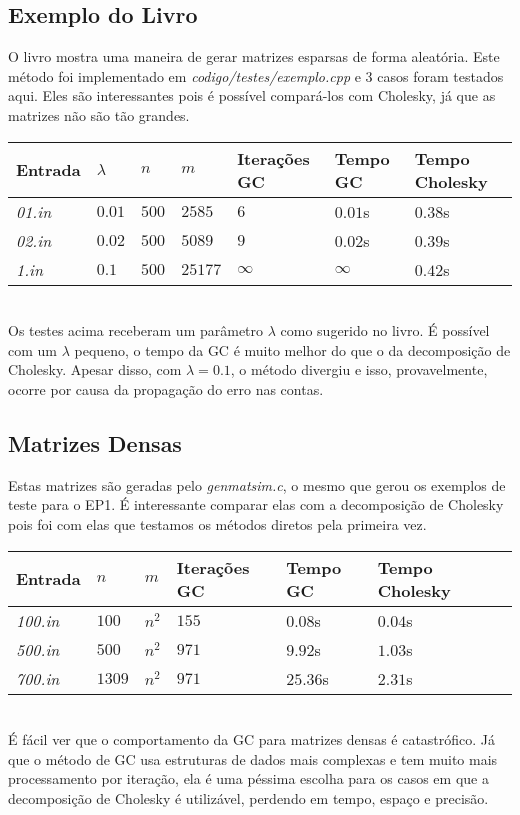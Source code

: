 \documentclass[
10pt, %
a4paper, %
oneside, %
headinclude,footinclude, %
BCOR5mm, %
]{scrartcl}
\begin{document}
\subsection{Exemplo do Livro}
O livro \cite{trefethen1997numerical} mostra uma maneira de gerar matrizes esparsas de forma aleatória. Este método foi implementado em \textit{codigo/testes/exemplo.cpp} e 3 casos foram testados aqui. Eles são interessantes pois é possível compará-los com Cholesky, já que as matrizes não são tão grandes. \\
\begin{tabular}{| l | l | l | l | l | l | l |}
    \hline
    Entrada & $\lambda$ & $n$ & $m$ & Iterações GC & Tempo GC & Tempo Cholesky \\ \hline
    \textit{01.in} & $0.01$ & $500$ & $2585$ & $6$ & $0.01$s & $0.38$s \\ \hline
    \textit{02.in} & $0.02$ & $500$ & $5089$ & $9$ & $0.02$s & $0.39$s \\ \hline
    \textit{1.in} & $0.1$ & $500$ & $25177$ & $\infty$ & $\infty$ & $0.42$s \\ \hline
\end{tabular} \\
Os testes acima receberam um parâmetro $\lambda$ como sugerido no livro. É possível com um $\lambda$ pequeno, o tempo da GC é muito melhor do que o da decomposição de Cholesky. Apesar disso, com $\lambda = 0.1$, o método divergiu e isso, provavelmente, ocorre por causa da propagação do erro nas contas.

\subsection{Matrizes Densas}
Estas matrizes são geradas pelo \textit{genmatsim.c}, o mesmo que gerou os exemplos de teste para o EP1. É interessante comparar elas com a decomposição de Cholesky pois foi com elas que testamos os métodos diretos pela primeira vez. \\
\begin{tabular}{| l | l | l | l | l | l | l |}
    \hline
    Entrada & $n$ & $m$ & Iterações GC & Tempo GC & Tempo Cholesky \\ \hline
    \textit{100.in} & $100$ & $n^2$ & $155$ & $0.08$s & $0.04$s \\ \hline
    \textit{500.in} & $500$ & $n^2$ & $971$ & $9.92$s & $1.03$s \\ \hline
    \textit{700.in} & $1309$ & $n^2$ & $971$ & $25.36$s & $2.31$s \\ \hline
\end{tabular} \\
É fácil ver que o comportamento da GC para matrizes densas é catastrófico. Já que o método de GC usa estruturas de dados mais complexas e tem muito mais processamento por iteração, ela é uma péssima escolha para os casos em que a decomposição de Cholesky é utilizável, perdendo em tempo, espaço e precisão.
\end{document}
